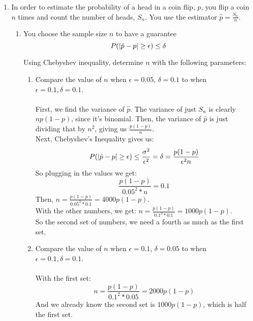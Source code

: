 \begin{enumerate}
  \item In order to estimate the probability of a head in a coin flip, $p$, you flip a coin $n$ times and count the number of heads, $S_n$. You use the estimator $\hat{p} = \frac{S_n}{n}$.
    \begin{enumerate}
      \item You choose the sample size $n$ to have a guarantee
        $$P(\left\vert \hat{p} - p \right\vert \geq \epsilon) \leq \delta$$

        Using Chebyshev inequality, determine $n$ with the following parameters:
        \begin{enumerate}
          \item Compare the value of $n$ when $\epsilon = 0.05$, $\delta = 0.1$ to when $\epsilon = 0.1, \delta = 0.1$.\\\\

            First, we find the variance of $\hat{p}$. The variance of just $S_n$ is clearly $np(1-p)$, since it's binomial. Then, the variance of $\hat{p}$ is just dividing that by $n^2$, giving us $\frac{p(1-p)}{n}$.\\
            Next, Chebyshev's Inequality gives us:
            $$P(\left\vert \hat{p} - p \right\vert \geq \epsilon) \leq \frac{\sigma^2}{\epsilon^2} = \delta = \frac{p(1-p)}{\epsilon^2 n}$$
            So plugging in the values we get:
            $$\frac{p(1-p)}{0.05^2 * n} = 0.1$$
            Then, $n = \frac{p(1-p)}{0.05^2 * 0.1} = 4000p(1-p)$.\\

            With the other numbers, we get:
            $n = \frac{p(1-p)}{0.1^2 * 0.1} = 1000p(1-p)$.\\
            
            So the second set of numbers, we need a fourth as much as the first set.\\

          \item Compare the value of $n$ when $\epsilon = 0.1$, $\delta = 0.05$ to when $\epsilon = 0.1, \delta = 0.1$.\\\\

            With the first set:
            $$n = \frac{p(1-p)}{0.1^2 * 0.05} = 2000p(1-p)$$
            And we already know the second set is $1000p(1-p)$, which is half the first set.
        \end{enumerate}


\end{enumerate}
\end{enumerate}
